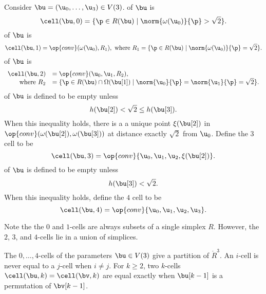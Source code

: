 \begin{definition} Consider $\bu=( \u_0,\ldots,
\u_3)\in V(3)$.  \hfill\break\smallskip {} of $\bu$
is
\begin{displaymath}
\cell(\bu,0) = \{\p\in R(\bu) \mid \norm{\omega( \u_0)}{\p} > \sqrt2\}.
\end{displaymath}
\bigskip
{} of $\bu$ is 
\begin{displaymath}
\cell(\bu,1) = \op{conv}(\omega( \u_0),R_1),\hbox{ where } R_1 = \{\p \in R(\bu) \mid \norm{\omega( \u_0)}{\p}= \sqrt2\}.
\end{displaymath}
%
%
%
\bigskip
{} of $\bu$ is
\begin{displaymath}
\begin{array}{rll}
\cell(\bu,2) &= \op{conv}( \u_0, \u_1,R_2),\quad \\
\text{where } R_2 &= \{\p \in R(\bu)\cap \Omega(\bu[1]) \mid \norm{ \u_0}{\p}=\norm{ \u_1}{\p} =\sqrt2\}.
\end{array}
\end{displaymath}
\bigskip
{} of $\bu$ is defined to be empty unless 
\begin{displaymath}
h(\bu[2]) <\sqrt2 \le h(\bu[3]).
\end{displaymath}
When this inequality holds, there is a a unique point $\xi(\bu[2])$ in
$\op{conv}(\omega(\bu[2]),\omega(\bu[3]))$ at distance exactly
$\sqrt2$ from $ \u_0$.  Define the $3$ cell to be
\begin{displaymath}
\cell(\bu,3) = \op{conv}\{ \u_0, \u_1, \u_2,\xi(\bu[2])\}.
\end{displaymath}
\bigskip
{} of $\bu$ is defined to be empty unless
\begin{displaymath}
h(\bu[3]) <\sqrt2.
\end{displaymath}
When this inequality holds, define the $4$ cell to be
\begin{displaymath}
\cell(\bu,4) = \op{conv}\{ \u_0, \u_1, \u_2, \u_3\}.
\end{displaymath}
\end{definition}
%

Note the the $0$ and $1$-cells are always subsets of a single simplex
$R$.  However, the $2$, $3$, and $4$-cells lie in a union of
simplices.

\begin{lemma}  The $0,\ldots,4$-cells of the parameters $\bu\in  V(3)$
give a partition of $\ring{R}^3$.  An $i$-cell is never equal to a
$j$-cell when $i\ne j$. For $k\ge 2$, two $k$-cells
$\cell(\bu,k)=\cell(\bv,k)$ are equal exactly when $\bu[k-1]$ is a
permutation of $\bv[k-1]$.
\end{lemma}

